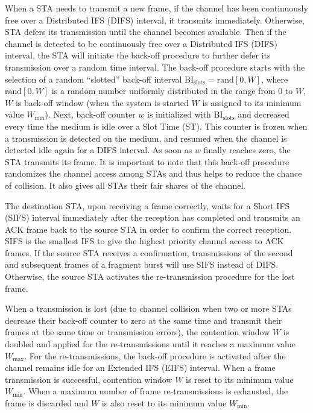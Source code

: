 \documentclass[12pt,onecolumn]{article}
\begin{document}
When a STA needs to transmit a new frame, if the channel has been continuously free over a Distributed IFS (DIFS) interval, it transmits immediately. Otherwise, STA defers its transmission until the channel becomes available. Then if the channel is detected to be continuously free over a Distributed IFS (DIFS) interval, the STA will initiate the back-off procedure to further defer its transmission over a random time interval. The back-off procedure starts with the selection of a random ``slotted'' back-off interval $\mathrm{BI_{slots}} = \mathrm{rand}[0,W]$, where $\mathrm{rand}[0,W]$ is a random number uniformly distributed in the range from $0$ to $W$, $W$ is back-off window (when the system is started $W$ is assigned to its minimum value $W_{\min}$). Next, back-off counter $w$ is initialized with $\mathrm{BI_{slots}}$ and decreased every time the medium is idle over a Slot Time (ST). This counter is frozen when a transmission is detected on the medium, and resumed when the channel is detected idle again for a DIFS interval. As soon as $w$ finally reaches zero, the STA transmits its frame. It is important to note that this back-off procedure randomizes the channel access among STAs and thus helps to reduce the chance of collision. It also gives all STAs their fair shares of the channel.

The destination STA, upon receiving a frame correctly, waits for a Short IFS (SIFS) interval immediately after the reception has completed and transmits an ACK frame back to the source STA in order to confirm the correct reception. SIFS is the smallest IFS to give the highest priority channel access to ACK frames. If the source STA receives a confirmation, transmissions of the second and subsequent frames of a fragment burst will use SIFS instead of DIFS. Otherwise, the source STA activates the re-transmission procedure for the lost frame.

When a transmission is lost (due to channel collision when two or more STAs decrease their back-off counter to zero at the same time and transmit their frames at the same time or transmission errors), the contention window $W$ is doubled and applied for the re-transmissions until it reaches a maximum value $W_{\max}$. For the re-transmissions, the back-off procedure is activated after the channel remains idle for an Extended IFS (EIFS) interval. When a frame transmission is successful, contention window $W$ is reset to its minimum value $W_{\min}$. When a maximum number of frame re-transmissions is exhausted, the frame is discarded and $W$ is also reset to its minimum value $W_{\min}$.
\end{document}
